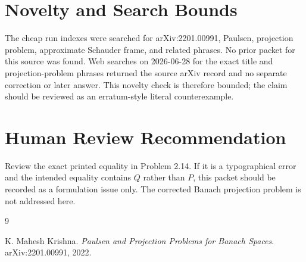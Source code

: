 \documentclass[11pt]{article}
\begin{document}
\section*{Novelty and Search Bounds}

The cheap run indexes were searched for arXiv:2201.00991, Paulsen,
projection problem, approximate Schauder frame, and related phrases.  No
prior packet for this source was found.  Web searches on 2026-06-28 for the
exact title and projection-problem phrases returned the source arXiv record
and no separate correction or later answer.  This novelty check is therefore
bounded; the claim should be reviewed as an erratum-style literal
counterexample.

\section*{Human Review Recommendation}

Review the exact printed equality in Problem 2.14.  If it is a typographical
error and the intended equality contains \(Q\) rather than \(P\), this packet
should be recorded as a formulation issue only.  The corrected Banach
projection problem is not addressed here.

\begin{thebibliography}{9}

K. Mahesh Krishna.
\newblock \emph{Paulsen and Projection Problems for Banach Spaces}.
\newblock arXiv:2201.00991, 2022.

\end{thebibliography}
\end{document}
